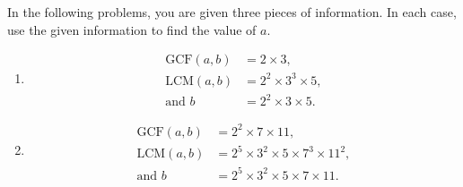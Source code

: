 \documentclass{ximera}
\begin{document}
\begin{problem}
In the following problems, you are given three pieces of
information. In each case, use the given information to find the value
of $a$.

\begin{enumerate}
\item 
\begin{align*}
  \text{GCF}(a,b) &= 2 \times 3,\\ \text{LCM}(a,b) &= 2^2 \times
  3^3 \times 5,\\ \text{and } b &= 2^2 \times 3 \times 5.
\end{align*}

\vfill
\item  
\begin{align*}
  \text{GCF}(a,b) &= 2^2 \times 7 \times 11,\\
  \text{LCM}(a,b) &= 2^5 \times 3^2 \times 5 \times 7^3 \times 11^2,\\
  \text{and }   b &= 2^5 \times 3^2 \times 5 \times 7 \times 11.
\end{align*}
\vfill
\end{enumerate}
\end{problem}
\end{document}
